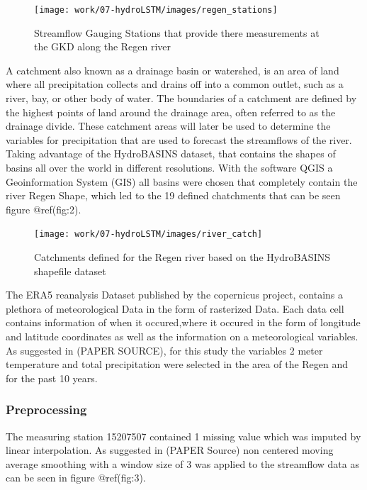 \documentclass[
]{article}
\begin{document}
\begin{figure}

{\centering \texttt{[image: work/07-hydroLSTM/images/regen\_stations]} 

}

\caption{Streamflow Gauging Stations that provide there measurements at the GKD along the Regen river}\label{fig:1}
\end{figure}

A catchment also known as a drainage basin or watershed, is an area of
land where all precipitation collects and drains off into a common
outlet, such as a river, bay, or other body of water. The boundaries of
a catchment are defined by the highest points of land around the
drainage area, often referred to as the drainage divide. These catchment
areas will later be used to determine the variables for precipitation
that are used to forecast the streamflows of the river. Taking advantage
of the HydroBASINS dataset, that contains the shapes of basins all over
the world in different resolutions. With the software QGIS a
Geoinformation System (GIS) all basins were chosen that completely
contain the river Regen Shape, which led to the 19 defined chatchments
that can be seen figure @ref(fig:2).

\begin{figure}

{\centering \texttt{[image: work/07-hydroLSTM/images/river\_catch]} 

}

\caption{Catchments defined for the Regen river based on the HydroBASINS shapefile dataset}\label{fig:2}
\end{figure}

The ERA5 reanalysis Dataset published by the copernicus project,
contains a plethora of meteorological Data in the form of rasterized
Data. Each data cell contains information of when it occured,where it
occured in the form of longitude and latitude coordinates as well as the
information on a meteorological variables. As suggested in (PAPER
SOURCE), for this study the variables 2 meter temperature and total
precipitation were selected in the area of the Regen and for the past 10
years.

\hypertarget{preprocessing}{%
\subsubsection{Preprocessing}\label{preprocessing}}

The measuring station 15207507 contained 1 missing value which was
imputed by linear interpolation. As suggested in (PAPER Source) non
centered moving average smoothing with a window size of 3 was applied to
the streamflow data as can be seen in figure @ref(fig:3).
\end{document}
